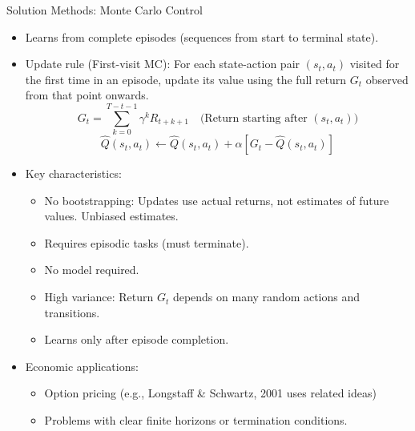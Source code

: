 \documentclass[10pt]{beamer}
\begin{document}

\begin{frame}{Solution Methods: Monte Carlo Control}
    \begin{itemize}
        \item Learns from complete episodes (sequences from start to terminal state).
        \item Update rule (First-visit MC): For each state-action pair $(s_t, a_t)$ visited for the first time in an episode, update its value using the full return $G_t$ observed from that point onwards.
        \begin{equation}
             G_t = \sum_{k=0}^{T-t-1} \gamma^k R_{t+k+1} \quad \text{(Return starting after } (s_t, a_t))
        \end{equation}
        \begin{equation}
            \hat{Q}(s_t,a_t) \leftarrow \hat{Q}(s_t,a_t) + \alpha \left[ G_t - \hat{Q}(s_t,a_t) \right]
        \end{equation}


        \item Key characteristics:
        \begin{itemize}
            \item No bootstrapping: Updates use actual returns, not estimates of future values. Unbiased estimates.
            \item Requires episodic tasks (must terminate).
            \item No model required.
            \item High variance: Return $G_t$ depends on many random actions and transitions.
            \item Learns only after episode completion.
        \end{itemize}

        \item Economic applications:
        \begin{itemize}
            \item Option pricing (e.g., Longstaff \& Schwartz, 2001 uses related ideas)
            \item Problems with clear finite horizons or termination conditions.
        \end{itemize}
    \end{itemize}
\end{frame}
\end{document}
